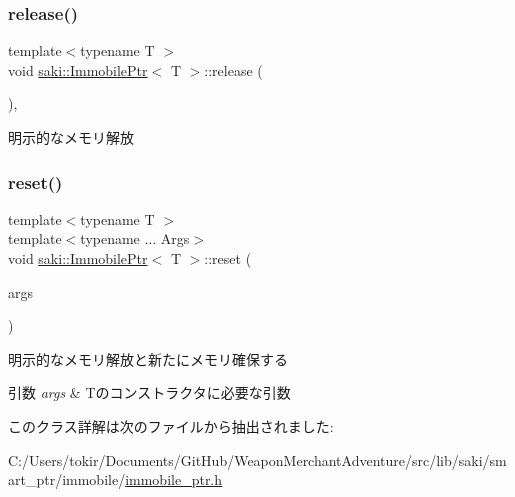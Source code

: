 \subsubsection{\texorpdfstring{release()}{release()}}
{\footnotesize\ttfamily template$<$typename T $>$ \\
void \mbox{\hyperlink{classsaki_1_1_immobile_ptr}{saki\+::\+Immobile\+Ptr}}$<$ T $>$\+::release (\begin{DoxyParamCaption}{ }\end{DoxyParamCaption})\hspace{0.3cm}{\ttfamily [inline]}, {\ttfamily [noexcept]}}



明示的なメモリ解放 

\mbox{\label{classsaki_1_1_immobile_ptr_abc92fb9bf2200ecc6304164ae6c00e09}} 
\subsubsection{\texorpdfstring{reset()}{reset()}}
{\footnotesize\ttfamily template$<$typename T $>$ \\
template$<$typename ... Args$>$ \\
void \mbox{\hyperlink{classsaki_1_1_immobile_ptr}{saki\+::\+Immobile\+Ptr}}$<$ T $>$\+::reset (\begin{DoxyParamCaption}\item[{Args ...}]{args }\end{DoxyParamCaption})\hspace{0.3cm}{\ttfamily [inline]}}



明示的なメモリ解放と新たにメモリ確保する 


\begin{DoxyParams}{引数}
{\em args} & Tのコンストラクタに必要な引数 \\
\hline
\end{DoxyParams}


このクラス詳解は次のファイルから抽出されました\+:\begin{DoxyCompactItemize}
\item 
C\+:/\+Users/tokir/\+Documents/\+Git\+Hub/\+Weapon\+Merchant\+Adventure/src/lib/saki/smart\+\_\+ptr/immobile/\mbox{\hyperlink{immobile__ptr_8h}{immobile\+\_\+ptr.\+h}}\end{DoxyCompactItemize}
